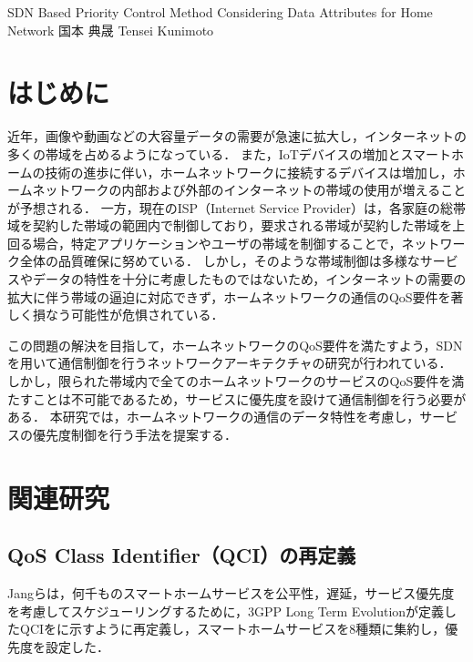 \documentclass[a4paper,10pt,twocolumn,uplatex]{jsarticle}
\date{11}
\begin{document}
{SDN Based Priority Control Method Considering Data Attributes for Home Network}
{国本 典晟}
{Tensei Kunimoto}

\section{はじめに}
近年，画像や動画などの大容量データの需要が急速に拡大し，インターネットの多くの帯域を占めるようになっている．
また，IoTデバイスの増加とスマートホームの技術の進歩に伴い，ホームネットワークに接続するデバイスは増加し，ホームネットワークの内部および外部のインターネットの帯域の使用が増えることが予想される．
一方，現在のISP（Internet Service Provider）は，各家庭の総帯域を契約した帯域の範囲内で制御しており，要求される帯域が契約した帯域を上回る場合，特定アプリケーションやユーザの帯域を制御することで，ネットワーク全体の品質確保に努めている．
しかし，そのような帯域制御は多様なサービスやデータの特性を十分に考慮したものではないため，インターネットの需要の拡大に伴う帯域の逼迫に対応できず，ホームネットワークの通信のQoS要件を著しく損なう可能性が危惧されている．\par
この問題の解決を目指して，ホームネットワークのQoS要件を満たすよう，SDNを用いて通信制御を行うネットワークアーキテクチャの研究が行われている．
しかし，限られた帯域内で全てのホームネットワークのサービスのQoS要件を満たすことは不可能であるため，サービスに優先度を設けて通信制御を行う必要がある．
本研究では，ホームネットワークの通信のデータ特性を考慮し，サービスの優先度制御を行う手法を提案する．\par

\section{関連研究}

\subsection{QoS Class Identifier（QCI）の再定義}
Jangらは，何千ものスマートホームサービスを公平性，遅延，サービス優先度を考慮してスケジューリングするために，3GPP Long Term Evolutionが定義したQCIをに示すように再定義し，スマートホームサービスを8種類に集約し，優先度を設定した\cite{framework}．\par
\end{document}
